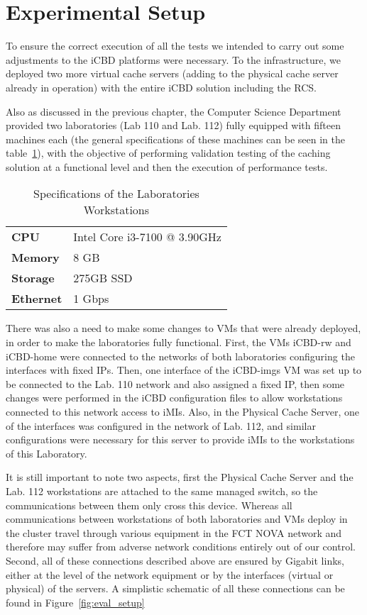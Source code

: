 \section{Experimental Setup}
\label{sec:eval_exp_setup}

To ensure the correct execution of all the tests we intended to carry out some adjustments to the iCBD platforms were necessary. To the infrastructure, we deployed two more virtual cache servers (adding to the physical cache server already in operation) with the entire iCBD solution including the RCS. 

Also as discussed in the previous chapter, the Computer Science Department provided two laboratories (Lab 110 and Lab. 112) fully equipped with fifteen machines each (the general specifications of these machines can be seen in the table~\ref{tab:exp_lab_work}), with the objective of performing validation testing of the caching solution at a functional level and then the execution of performance tests.

\begin{table}[]
\centering
\begin{tabular}{ll}
\textbf{CPU} & Intel Core i3-7100 @ 3.90GHz \\
\textbf{Memory} & 8 GB \\
\textbf{Storage} & 275GB SSD \\
\textbf{Ethernet} & 1 Gbps
\end{tabular}
\caption{Specifications of the Laboratories Workstations}
\label{tab:exp_lab_work}
\end{table}

There was also a need to make some changes to VMs that were already deployed, in order to make the laboratories fully functional. First, the VMs iCBD-rw and iCBD-home were connected to the networks of both laboratories configuring the interfaces with fixed IPs. Then, one interface of the iCBD-imgs VM was set up to be connected to the Lab. 110 network and also assigned a fixed IP, then some changes were performed in the iCBD configuration files to allow workstations connected to this network access to iMIs. Also, in the Physical Cache Server, one of the interfaces was configured in the network of Lab. 112, and similar configurations were necessary for this server to provide iMIs to the workstations of this Laboratory.

It is still important to note two aspects, first the Physical Cache Server and the Lab. 112 workstations are attached to the same managed switch, so the communications between them only cross this device. Whereas all communications between workstations of both laboratories and VMs deploy in the cluster travel through various equipment in the FCT NOVA network and therefore may suffer from adverse network conditions entirely out of our control. Second, all of these connections described above are ensured by Gigabit links, either at the level of the network equipment or by the interfaces (virtual or physical) of the servers. A simplistic schematic of all these connections can be found in Figure~\ref{fig:eval_setup}

